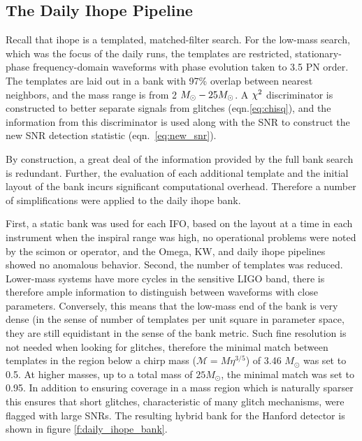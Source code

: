 \subsection{The Daily Ihope Pipeline}


Recall that ihope is a templated, matched-filter search.  For the
low-mass search, which was the focus of the daily runs, the templates
are restricted, stationary-phase frequency-domain waveforms with phase
evolution taken to 3.5 PN order.  The templates are laid out in a bank
with 97\% overlap between nearest neighbors, and the mass range is
from 2 $M_\odot - 25 M_\odot$.  A $\chi^2$ discriminator is constructed to
better separate signals from glitches (eqn.\ref{eq:chisq}), and the
information from this discriminator is used along with the SNR to
construct the new SNR detection statistic (eqn.~\ref{eq:new_snr}).

By construction, a great deal of the information provided by
the full bank search is redundant.  Further, the evaluation of each
additional template and the initial layout of the bank incurs
significant computational overhead.  Therefore a number of
simplifications were applied to the daily ihope bank.

First, a static bank was used for each IFO, based on the layout at a
time in each instrument when the inspiral range was high, no
operational problems were noted by the scimon or operator, and the
Omega, KW, and daily ihope pipelines showed no anomalous behavior.
Second, the number of templates was reduced.  Lower-mass systems have
more cycles in the sensitive LIGO band, there is therefore ample
information to distinguish between waveforms with close parameters.
Conversely, this means that the low-mass end of the bank is very dense
(in the sense of number of templates per unit square in parameter
space, they are still equidistant in the sense of the bank metric.
Such fine resolution is not needed when looking for glitches,
therefore the minimal match between templates in the region below a
chirp mass ($\mathcal{M} = M \eta^{3/5}$) of 3.46 $M_\odot$ was set to
0.5.  At higher masses, up to a total mass of $25 M_\odot$, the
minimal match was set to 0.95.  In addition to ensuring coverage in a
mass region which is naturally sparser this ensures that short
glitches, characteristic of many glitch mechanisms, were flagged with
large SNRs.  The resulting hybrid bank for the Hanford detector is
shown in figure \ref{f:daily_ihope_bank}.

